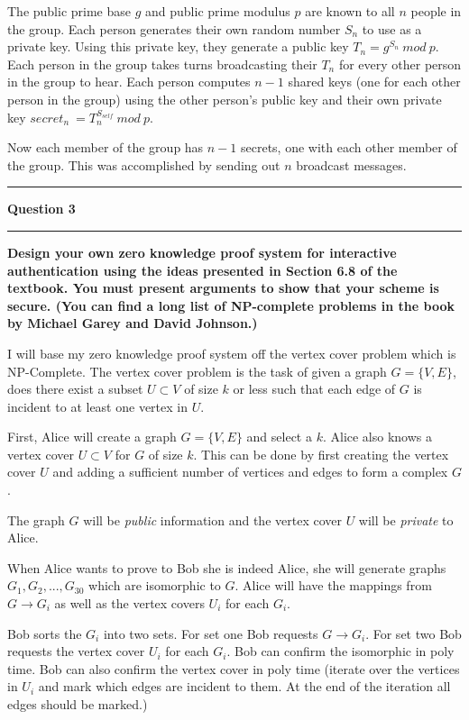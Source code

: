 \documentclass[11pt]{article}
\newcommand\question[2]{\vspace{.25in}\hrule\textbf{#1}\vspace{.5em}\hrule\vspace{.10in}}
\renewcommand\part[1]{\vspace{.10in}\textbf{(#1)}}
\begin{document}
The public prime base $g$ and public prime modulus $p$ are known to all $n$ people in the group. Each person generates their own random number $S_n$ to use as a private key. Using this private key, they generate a public key $T_n = g^{S_n} \ mod \ p$. Each person in the group takes turns broadcasting their $T_n$ for every other person in the group to hear. Each person computes $n-1$ shared keys (one for each other person in the group) using the other person's public key and their own private key $secret_n \ = T_n^{S_{self}} \ mod \ p$.

Now each member of the group has $n - 1$ secrets, one with each other member of the group. This was accomplished by sending out $n$ broadcast messages.

\question{Question 3}

\part{a} \textbf{Design your own zero knowledge proof system for interactive authentication using the ideas presented in Section 6.8 of the textbook. You must present arguments to show that your scheme is secure. (You can find a long list of NP-complete problems in the book by Michael Garey and David Johnson.)}

I will base my zero knowledge proof system off the vertex cover problem which is NP-Complete. The vertex cover problem is the task of given a graph $G = \{V, E\}$, does there exist a subset $U \subset V$ of size $k$ or less such that each edge of $G$ is incident to at least one vertex in $U$.

First, Alice will create a graph $G = \{V, E\}$ and select a $k$. Alice also knows a vertex cover $U \subset V$ for $G$ of size $k$. This can be done by first creating the vertex cover $U$ and adding a sufficient number of vertices and edges to form a complex $G$.

The graph $G$ will be \textit{public} information and the vertex cover $U$ will be \textit{private} to Alice.

When Alice wants to prove to Bob she is indeed Alice, she will generate graphs $G_1, G_2, ..., G_{30}$ which are isomorphic to $G$. Alice will have the mappings from $G \rightarrow G_i$ as well as the vertex covers $U_i$ for each $G_i$.

Bob sorts the $G_i$ into two sets. For set one Bob requests $G \rightarrow G_i$. For set two Bob requests the vertex cover $U_i$ for each $G_i$. Bob can confirm the isomorphic in poly time. Bob can also confirm the vertex cover in poly time (iterate over the vertices in $U_i$ and mark which edges are incident to them. At the end of the iteration all edges should be marked.)
\end{document}
